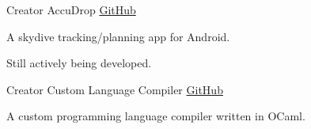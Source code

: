 \begin{cventries}

  \vspace{-3.0mm}
  \begin{minipage}{0.45\textwidth}
  \cventry
    {Creator} %
    {AccuDrop} %
    {\href{https://github.com/ChrisLane/accudrop}{GitHub}} %
    {} %
    {
      \begin{cvitems} %
        \item {A skydive tracking/planning app for Android.}
        \item {Still actively being developed.}
      \end{cvitems}
    }
  \end{minipage}%
  \hspace*{0.05\textwidth}
  \begin{minipage}{0.5\textwidth}
  \cventry
    {Creator} %
    {Custom Language Compiler} %
    {\href{https://github.com/ChrisLane/custom-lang-compiler}{GitHub}} %
    {} %
    {
      \begin{cvitems} %
      \item {A custom programming language compiler written in OCaml.}
      \end{cvitems}
    }
  \end{minipage}


\end{cventries}
